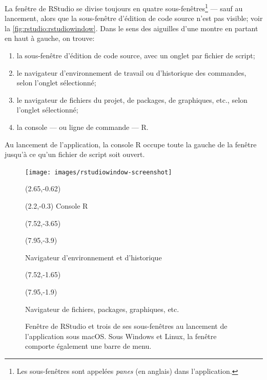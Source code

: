 La fenêtre de RStudio se divise toujours en quatre
sous-fenêtres\footnote{%
  Les sous-fenêtres sont appelées \emph{panes} (en anglais) dans
  l'application.} %
--- sauf au lancement, alors que la sous-fenêtre d'édition de code
source n'est pas visible; voir la \autoref{fig:rstudio:rstudiowindow}.
Dans le sens des aiguilles d'une montre en partant en haut à gauche,
on trouve:
\begin{enumerate}
\item la sous-fenêtre d'édition de code source, avec un onglet par
  fichier de script;
\item le navigateur d'environnement de travail ou d'historique des
  commandes, selon l'onglet sélectionné;
\item le navigateur de fichiers du projet, de packages, de graphiques,
  etc., selon l'onglet sélectionné;
\item la console --- ou ligne de commande --- R.
\end{enumerate}
Au lancement de l'application, la console R occupe toute la gauche de
la fenêtre jusqu'à ce qu'un fichier de script soit ouvert.

\begin{figure}[t]
  \texttt{[image: images/rstudiowindow-screenshot]}
  \vspace{0.5\TPVertModule}

  \begingroup
  \begin{textblock}{0.5}(2.65,-0.62)
    \large\faLongArrowDown
  \end{textblock}
  \begin{textblock}{2}(2.2,-0.3)
    \footnotesize\sffamily Console R
  \end{textblock}

  \begin{textblock}{1}(7.52,-3.65)
    \large\faLongArrowRight
  \end{textblock}
  \begin{textblock}{2.2}(7.95,-3.9)
    \footnotesize\sffamily\raggedright Navigateur d'environnement et d'historique
  \end{textblock}

  \begin{textblock}{1}(7.52,-1.65)
    \large\faLongArrowRight
  \end{textblock}
  \begin{textblock}{2.2}(7.95,-1.9)
    \footnotesize\sffamily\raggedright Navigateur de fichiers, packages, graphiques, etc.
  \end{textblock}
  \endgroup
  \caption[Fenêtre de RStudio sous macOS]{Fenêtre de RStudio et trois
    de ses sous-fenêtres au lancement de l'application sous macOS.
    Sous Windows et Linux, la fenêtre comporte également une barre de
    menu.}
  \label{fig:rstudio:rstudiowindow}
\end{figure}

